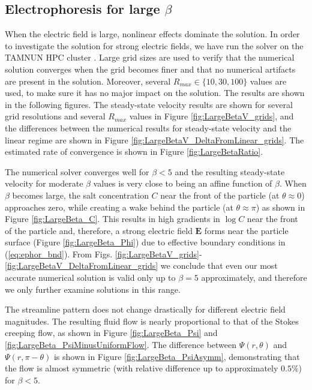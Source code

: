 \documentclass[preprint,10pt]{elsarticle}
\newcommand\bE{\boldsymbol{E}}
\begin{document}
\subsection{Electrophoresis for large $\beta$ }
When the electric field is large, nonlinear effects dominate the solution.
In order to investigate the solution for strong electric fields, 
we have run the solver on the TAMNUN HPC cluster \cite{tamnun}.
Large grid sizes are used to verify that the numerical solution converges when the grid becomes finer and that no numerical artifacts are present in the solution.
Moreover, several $R_{max} \in \{10, 30, 100\}$ values are used, to make sure it has no major impact on the solution.
The results are shown in the following figures. 
The steady-state velocity results are shown for several grid resolutions and several $R_{max}$ values in Figure \ref{fig:LargeBetaV_grids}, and the differences between the numerical results for
steady-state velocity and the linear regime are shown in Figure \ref{fig:LargeBetaV_DeltaFromLinear_grids}.
The estimated rate of convergence is shown in Figure \ref{fig:LargeBetaRatio}.

The numerical solver converges well for $\beta < 5$ and the resulting steady-state velocity 
for moderate $\beta$ values is very close to being an affine function of $\beta$.
When $\beta$ becomes large, the salt concentration $C$ near the front of the particle 
(at $\theta \approx 0$) approaches zero, while creating a wake behind the particle 
(at $\theta \approx \pi$) as shown in Figure \ref{fig:LargeBeta_C}. 
This results in high gradients in $\log C$ near the front of the particle  and, therefore, a strong electric field $\bE$ forms near the particle surface (Figure \ref{fig:LargeBeta_Phi}) due to effective boundary conditions in (\ref{eq:ephor_bnd}). 
From Figs. \ref{fig:LargeBetaV_grids}-\ref{fig:LargeBetaV_DeltaFromLinear_grids} we conclude that even our most accurate numerical solution is valid only up to $\beta = 5$ approximately, and therefore we only further examine solutions in this range.

The streamline pattern does not change drastically for different electric field magnitudes. 
The resulting fluid flow is nearly proportional to that of the Stokes creeping flow, 
as shown in Figure \ref{fig:LargeBeta_Psi} and \ref{fig:LargeBeta_PsiMinusUniformFlow}. 
The difference between $\Psi(r, \theta)$ and $\Psi(r, \pi-\theta)$ is shown in Figure \ref{fig:LargeBeta_PsiAsymm}, demonstrating that the flow is almost symmetric (with relative
difference up to approximately $0.5\%$) for $\beta < 5$.
\end{document}
